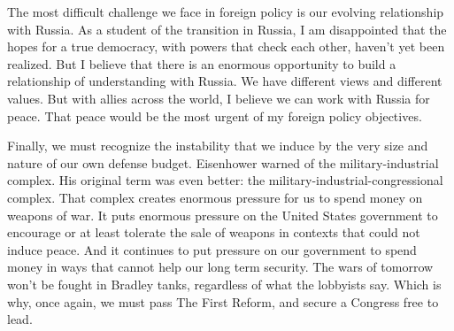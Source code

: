 The most difficult challenge we face in foreign policy is our evolving relationship with Russia. As a student of the transition in Russia, I am disappointed that the hopes for a true democracy, with powers that check each other, haven't yet been realized. But I believe that there is an enormous opportunity to build a relationship of understanding with Russia. We have different views and different values. But with allies across the world, I believe we can work with Russia for peace. That peace would be the most urgent of my foreign policy objectives.

Finally, we must recognize the instability that we induce by the very size and nature of our own defense budget. Eisenhower warned of the military-industrial complex. His original term was even better: the military-industrial-congressional complex. That complex creates enormous pressure for us to spend money on weapons of war. It puts enormous pressure on the United States government to encourage or at least tolerate the sale of weapons in contexts that could not induce peace. And it continues to put pressure on our government to spend money in ways that cannot help our long term security. The wars of tomorrow won't be fought in Bradley tanks, regardless of what the lobbyists say. Which is why, once again, we must pass The First Reform, and secure a Congress free to lead.
